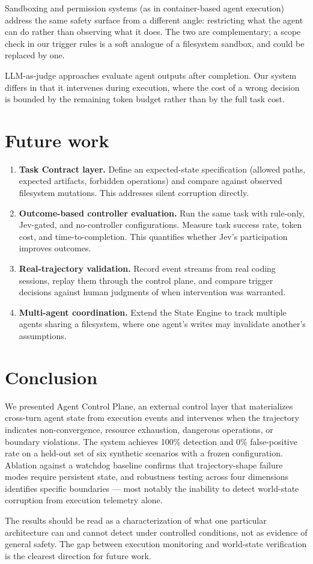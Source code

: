 \documentclass[11pt,a4paper]{article}
\begin{document}
Sandboxing and permission systems (as in container-based agent execution) address the same safety surface from a different angle: restricting what the agent can do rather than observing what it does. The two are complementary; a scope check in our trigger rules is a soft analogue of a filesystem sandbox, and could be replaced by one.

LLM-as-judge approaches evaluate agent outputs after completion. Our system differs in that it intervenes during execution, where the cost of a wrong decision is bounded by the remaining token budget rather than by the full task cost.

\section{Future work}

\begin{enumerate}
\item \textbf{Task Contract layer.} Define an expected-state specification (allowed paths, expected artifacts, forbidden operations) and compare against observed filesystem mutations. This addresses silent corruption directly.

\item \textbf{Outcome-based controller evaluation.} Run the same task with rule-only, Jev-gated, and no-controller configurations. Measure task success rate, token cost, and time-to-completion. This quantifies whether Jev's participation improves outcomes.

\item \textbf{Real-trajectory validation.} Record event streams from real coding sessions, replay them through the control plane, and compare trigger decisions against human judgments of when intervention was warranted.

\item \textbf{Multi-agent coordination.} Extend the State Engine to track multiple agents sharing a filesystem, where one agent's writes may invalidate another's assumptions.
\end{enumerate}

\section{Conclusion}

We presented Agent Control Plane, an external control layer that materializes cross-turn agent state from execution events and intervenes when the trajectory indicates non-convergence, resource exhaustion, dangerous operations, or boundary violations. The system achieves 100\% detection and 0\% false-positive rate on a held-out set of six synthetic scenarios with a frozen configuration. Ablation against a watchdog baseline confirms that trajectory-shape failure modes require persistent state, and robustness testing across four dimensions identifies specific boundaries --- most notably the inability to detect world-state corruption from execution telemetry alone.

The results should be read as a characterization of what one particular architecture can and cannot detect under controlled conditions, not as evidence of general safety. The gap between execution monitoring and world-state verification is the clearest direction for future work.
\end{document}
